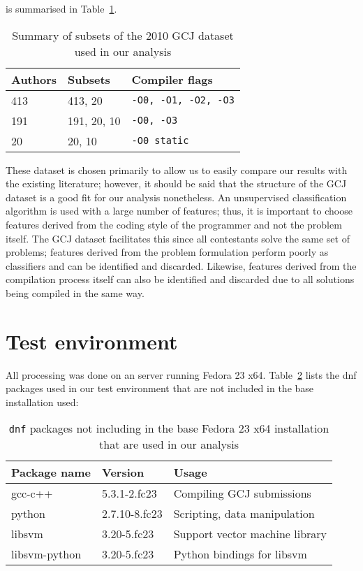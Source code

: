 \documentclass[a4paper,11pt]{kth-mag}
\begin{document}
is summarised in Table~\ref{tab:datasets-summary}.

\begin{table}[!htb]
    \centering
        \begin{tabular}{ l l l }
        Authors & Subsets & Compiler flags \\ \hline
        413 & 413, 20 &  \lstinline{-O0, -O1, -O2, -O3} \\ 
        191 & 191, 20, 10 &  \lstinline{-O0, -O3} \\ 
        20 & 20, 10 &  \lstinline{-O0 static} 
        \end{tabular}
    \caption{Summary of subsets of the 2010 GCJ dataset used in our analysis}
    \label{tab:datasets-summary}
\end{table}

These dataset is chosen primarily to allow us to easily compare our results
with the existing literature; however, it should be said that the structure of
the GCJ dataset is a good fit for our analysis nonetheless. An
unsupervised classification algorithm is used with a large number of features; thus, it is
important to choose features derived from the coding style of the programmer
and not the problem itself. The GCJ dataset facilitates this since all
contestants solve the same set of problems; features derived from the problem
formulation perform poorly as classifiers and can be identified and discarded.
Likewise, features derived from the compilation process itself can also be
identified and discarded due to all solutions being compiled in the same way.

\section{Test environment}
All processing was done on an server running Fedora 23 x64.
Table~\ref{tab:dnf-packages} lists the dnf packages used in our test
environment that are not included in the base installation used:

\begin{table}[!htb]
    \centering
        \begin{tabular}{ l l l }
        Package name & Version & Usage \\ \hline
        gcc-c++ & 5.3.1-2.fc23 & Compiling GCJ submissions \\
        python & 2.7.10-8.fc23 & Scripting, data manipulation \\
        libsvm & 3.20-5.fc23  & Support vector machine library \\
        libsvm-python & 3.20-5.fc23 & Python bindings for libsvm
        \end{tabular}
    \caption{\lstinline{dnf} packages not including in the base Fedora 23 x64
    installation that are used in our analysis}
    \label{tab:dnf-packages}
\end{table}
\end{document}
